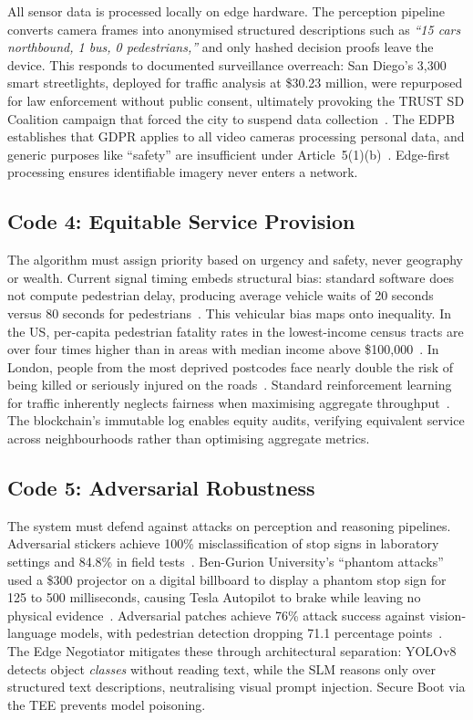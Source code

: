 \documentclass[sigconf,nonacm]{acmart}
\begin{document}
All sensor data is processed locally on edge hardware. The perception pipeline converts camera frames into anonymised structured descriptions such as \textit{``15 cars northbound, 1 bus, 0 pedestrians,''} and only hashed decision proofs leave the device. This responds to documented surveillance overreach: San Diego's 3,300 smart streetlights, deployed for traffic analysis at \$30.23 million, were repurposed for law enforcement without public consent, ultimately provoking the TRUST SD Coalition campaign that forced the city to suspend data collection~\cite{sandiego}. The EDPB establishes that GDPR applies to all video cameras processing personal data, and generic purposes like ``safety'' are insufficient under Article~5(1)(b)~\cite{edpb2020}. Edge-first processing ensures identifiable imagery never enters a network.

\subsection{Code 4: Equitable Service Provision}

The algorithm must assign priority based on urgency and safety, never geography or wealth. Current signal timing embeds structural bias: standard software does not compute pedestrian delay, producing average vehicle waits of 20 seconds versus 80 seconds for pedestrians~\cite{nchrp969}. This vehicular bias maps onto inequality. In the US, per-capita pedestrian fatality rates in the lowest-income census tracts are over four times higher than in areas with median income above \$100,000~\cite{dangerousbydesign}. In London, people from the most deprived postcodes face nearly double the risk of being killed or seriously injured on the roads~\cite{tflequity}. Standard reinforcement learning for traffic inherently neglects fairness when maximising aggregate throughput~\cite{raeis2021}. The blockchain's immutable log enables equity audits, verifying equivalent service across neighbourhoods rather than optimising aggregate metrics.

\subsection{Code 5: Adversarial Robustness}

The system must defend against attacks on perception and reasoning pipelines. Adversarial stickers achieve 100\% misclassification of stop signs in laboratory settings and 84.8\% in field tests~\cite{eykholt2018}. Ben-Gurion University's ``phantom attacks'' used a \$300 projector on a digital billboard to display a phantom stop sign for 125 to 500 milliseconds, causing Tesla Autopilot to brake while leaving no physical evidence~\cite{nassi2020}. Adversarial patches achieve 76\% attack success against vision-language models, with pedestrian detection dropping 71.1 percentage points~\cite{fernandez2025}. The Edge Negotiator mitigates these through architectural separation: YOLOv8 detects object \textit{classes} without reading text, while the SLM reasons only over structured text descriptions, neutralising visual prompt injection. Secure Boot via the TEE prevents model poisoning.
\end{document}
